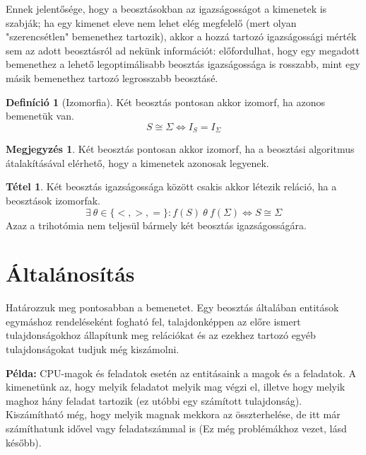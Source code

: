 \documentclass{article}
\theoremstyle{definition}
\newtheorem{definition}{Definíció}[section]
\newtheorem{theorem}{Tétel}[section]
\newtheorem*{megj}{Megjegyzés}
\newcommand{\set}[1]{ \{ {#1} \} }
\newcommand{\pl}{ \textbf{Példa:} }
\begin{document}
\begin{multicols}{2}
    Ennek jelentősége, hogy a beosztásokban az igazságosságot a kimenetek is szabják; ha egy kimenet eleve nem lehet elég megfelelő (mert olyan "szerencsétlen" bemenethez tartozik), akkor a hozzá tartozó igazságossági mérték sem az adott beosztásról ad nekünk információt: előfordulhat, hogy egy megadott bemenethez a lehető legoptimálisabb beosztás igazságossága is rosszabb, mint egy másik bemenethez tartozó legrosszabb beosztásé.
    
    \begin{definition}[Izomorfia]
        Két beosztás pontosan akkor izomorf, ha azonos bemenetük van.
        \begin{equation} S \cong \Sigma \Longleftrightarrow I_S = I_\Sigma \end{equation}
        \begin{megj}
            Két beosztás pontosan akkor izomorf, ha a beosztási algoritmus átalakításával elérhető, hogy a kimenetek azonosak legyenek.
        \end{megj}
    \end{definition}
    
    \begin{theorem}\label{thm:trihotomia}
        Két beosztás igazságossága között csakis akkor létezik reláció, ha a beosztások izomorfak.
        \begin{equation} \exists \ \theta \in \set{<, >, =}: f(S)\ \theta\ f(\Sigma) \Longleftrightarrow S \cong \Sigma \end{equation}
        Azaz a trihotómia nem teljesül bármely két beosztás igazságosságára.
    \end{theorem}
    
\section{Általánosítás}
    
    Határozzuk meg pontosabban a bemenetet. Egy beosztás általában entitások egymáshoz rendeléseként fogható fel, talajdonképpen az előre ismert tulajdonságokhoz állapítunk meg relációkat és az ezekhez tartozó egyéb tulajdonságokat tudjuk még kiszámolni.
    
    \pl CPU-magok és feladatok esetén az entitásaink a magok és a feladatok. A kimenetünk az, hogy melyik feladatot melyik mag végzi el, illetve hogy melyik maghoz hány feladat tartozik (ez utóbbi egy számított tulajdonság). Kiszámítható még, hogy melyik magnak mekkora az összterhelése, de itt már számíthatunk idővel vagy feladatszámmal is (Ez még problémákhoz vezet, lásd később).
    

\end{multicols}
\end{document}
